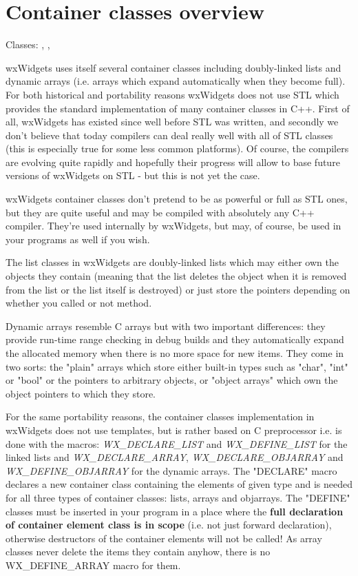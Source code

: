 \section{Container classes overview}\label{wxcontaineroverview}

Classes: , , 

wxWidgets uses itself several container classes including doubly-linked lists
and dynamic arrays (i.e. arrays which expand automatically when they become
full). For both historical and portability reasons wxWidgets does not
use STL which provides the standard implementation of many container classes in
C++. First of all, wxWidgets has existed since well before STL was written, and
secondly we don't believe that today compilers can deal really well with all of
STL classes (this is especially true for some less common platforms). Of
course, the compilers are evolving quite rapidly and hopefully their progress
will allow to base future versions of wxWidgets on STL - but this is not yet
the case.

wxWidgets container classes don't pretend to be as powerful or full as STL
ones, but they are quite useful and may be compiled with absolutely any C++
compiler. They're used internally by wxWidgets, but may, of course, be used in
your programs as well if you wish.

The list classes in wxWidgets are doubly-linked lists which may either own the
objects they contain (meaning that the list deletes the object when it is
removed from the list or the list itself is destroyed) or just store the
pointers depending on whether you called or not 
 method.

Dynamic arrays resemble C arrays but with two important differences: they
provide run-time range checking in debug builds and they automatically expand
the allocated memory when there is no more space for new items. They come in
two sorts: the "plain" arrays which store either built-in types such as "char",
"int" or "bool" or the pointers to arbitrary objects, or "object arrays" which
own the object pointers to which they store.

For the same portability reasons, the container classes implementation in wxWidgets
does not use templates, but is rather based on C preprocessor i.e. is done with
the macros: {\it WX\_DECLARE\_LIST} and {\it WX\_DEFINE\_LIST} for the linked
lists and {\it WX\_DECLARE\_ARRAY}, {\it WX\_DECLARE\_OBJARRAY} and {\it WX\_DEFINE\_OBJARRAY} for
the dynamic arrays. The "DECLARE" macro declares a
new container class containing the elements of given type and is needed for all
three types of container classes: lists, arrays and objarrays. The "DEFINE"
classes must be inserted in your program in a place where the {\bf full
declaration of container element class is in scope} (i.e. not just forward
declaration), otherwise destructors of the container elements will not be
called! As array classes never delete the items they contain anyhow, there is
no WX\_DEFINE\_ARRAY macro for them.

